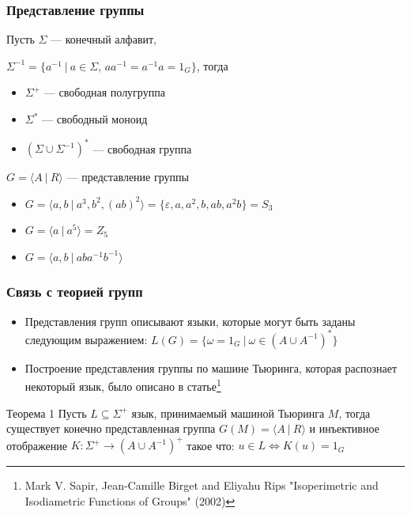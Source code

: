 \documentclass[xcolor=table]{beamer}
\begin{document}
\begin{frame}[fragile]
 \frametitle{Представление группы}
        Пусть $\Sigma$ --- конечный алфавит,
        
        $\Sigma^{-1} = \{ a^{-1}~|~a \in \Sigma, \, 
        a a^{-1} = a^{-1} a = 1_G \}$, тогда
    \begin{itemize}
        \item $\Sigma^+$ --- свободная полугруппа
        \item $\Sigma^*$ --- свободный моноид
        \item $(\Sigma \cup \Sigma^{-1})^*$ --- свободная группа
    \end{itemize}
    
    \pause
        $G = \langle A~|~R \rangle$ --- представление группы
    \begin{itemize}
        \item $G = \langle a, b~|~a^3, b^2, (ab)^2 \rangle = \{\varepsilon, a, a^2, b, ab, a^2b\} = S_3$
        \item $G = \langle a~|~a^5\rangle = Z_5$
        \item $G = \langle a, b~|~aba^{-1}b^{-1} \rangle$
    \end{itemize}
\end{frame}

\begin{frame}[fragile]
 \frametitle{Связь с теорией групп}
    \begin{itemize}
        \item Представления групп описывают языки, которые могут быть заданы следующим выражением: $L(G) = \{\omega = 1_G ~|~ \omega \in (A \cup A^{-1})^*\}$
        \item Построение представления группы по машине Тьюринга, которая распознает некоторый язык, было описано в статье\footnote{Mark V. Sapir, Jean-Camille Birget and Eliyahu Rips "Isoperimetric and Isodiametric Functions of Groups" (2002)}
    \end{itemize}
    \begin{block}{Теорема 1}
		Пусть $L \subseteq \Sigma^+$ язык, принимаемый машиной Тьюринга $M$,
    тогда существует конечно представленная группа $G(M)=\langle A~|~R \rangle$
    и инъективное отображение $K: \Sigma^+ \to (A \cup A^{-1})^+$ такое что:
    $u \in L \iff K(u)=1_G$
	\end{block}
\end{frame}
\end{document}
